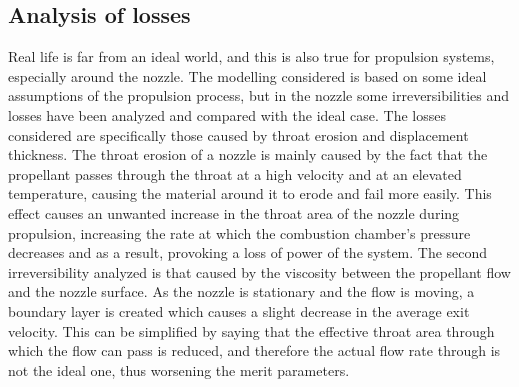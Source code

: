 \subsection{Analysis of losses}
\label{subsec:losses_intro}
Real life is far from an ideal world, and this is also true for propulsion systems, especially around the nozzle. The modelling considered is based on some ideal assumptions of the propulsion process, but in the nozzle some irreversibilities and losses have been analyzed and compared with the ideal case. The losses considered are specifically those caused by throat erosion and displacement thickness. The throat erosion of a nozzle is mainly caused by the fact that the propellant passes through the throat at a high velocity and at an elevated temperature, causing the material around it to erode and fail more easily. This effect causes an unwanted increase in the throat area of the nozzle during propulsion, increasing the rate at which the combustion chamber's pressure decreases and as a result, provoking a loss of power of the system. The second irreversibility analyzed is that caused by the viscosity between the propellant flow and the nozzle surface. As the nozzle is stationary and the flow is moving, a boundary layer is created which causes a slight decrease in the average exit velocity. This can be simplified by saying that the effective throat area through which the flow can pass is reduced, and therefore the actual flow rate through is not the ideal one, thus worsening the merit parameters.